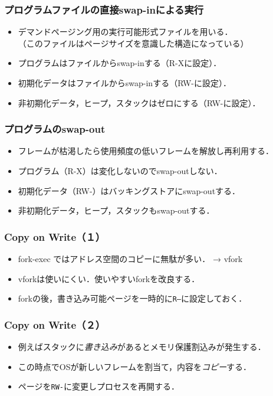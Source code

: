 \documentclass{beamer}                   %
\begin{document}
\begin{frame}
  \frametitle{プログラムファイルの直接swap-inによる実行}
  \begin{itemize}
  \item デマンドページング用の実行可能形式ファイルを用いる．\\
    （このファイルはページサイズを意識した構造になっている）
  \item プログラムはファイルからswap-inする（R-Xに設定）．
  \item 初期化データはファイルからswap-inする（RW-に設定）．
  \item 非初期化データ，ヒープ，スタックはゼロにする（RW-に設定）．
  \end{itemize}
\end{frame}

\begin{frame}
  \frametitle{プログラムのswap-out}
  \begin{itemize}
  \item フレームが枯渇したら使用頻度の低いフレームを解放し再利用する．
  \item プログラム（R-X）は変化しないのでswap-outしない．
  \item 初期化データ（RW-）はバッキングストアにswap-outする．
  \item 非初期化データ，ヒープ，スタックもswap-outする．
  \end{itemize}
\end{frame}

\begin{frame}
  \frametitle{Copy on Write（１）}
  \begin{itemize}
  \item fork-exec ではアドレス空間のコピーに無駄が多い． → vfork
  \item vforkは使いにくい．使いやすいforkを改良する．
  \item forkの後，書き込み可能ページを一時的に\texttt{R--}に設定しておく．
  \end{itemize}
\end{frame}

\begin{frame}
  \frametitle{Copy on Write（２）}
  \begin{itemize}
  \item 例えばスタックに\emph{書き込み}があるとメモリ保護割込みが発生する．
  \item この時点でOSが新しいフレームを割当て，内容を\emph{コピー}する．
  \item ページを\texttt{RW-}に変更しプロセスを再開する．
  \end{itemize}
\end{frame}
\end{document}
